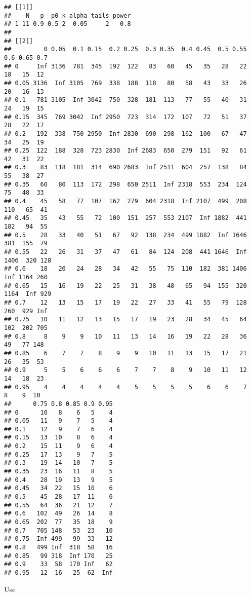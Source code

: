 \documentclass[
]{article}
\begin{document}
\begin{verbatim}
## [[1]]
##    N   p  p0 k alpha tails power
## 1 11 0.9 0.5 2  0.05     2   0.8
## 
## [[2]]
##         0 0.05  0.1 0.15  0.2 0.25  0.3 0.35  0.4 0.45  0.5 0.55  0.6 0.65 0.7
## 0     Inf 3136  781  345  192  122   83   60   45   35   28   22   18   15  12
## 0.05 3136  Inf 3105  769  338  188  118   80   58   43   33   26   20   16  13
## 0.1   781 3105  Inf 3042  750  328  181  113   77   55   40   31   24   19  15
## 0.15  345  769 3042  Inf 2950  723  314  172  107   72   51   37   28   22  17
## 0.2   192  338  750 2950  Inf 2830  690  298  162  100   67   47   34   25  19
## 0.25  122  188  328  723 2830  Inf 2683  650  279  151   92   61   42   31  22
## 0.3    83  118  181  314  690 2683  Inf 2511  604  257  138   84   55   38  27
## 0.35   60   80  113  172  298  650 2511  Inf 2318  553  234  124   75   48  33
## 0.4    45   58   77  107  162  279  604 2318  Inf 2107  499  208  110   65  41
## 0.45   35   43   55   72  100  151  257  553 2107  Inf 1882  441  182   94  55
## 0.5    28   33   40   51   67   92  138  234  499 1882  Inf 1646  381  155  79
## 0.55   22   26   31   37   47   61   84  124  208  441 1646  Inf 1406  320 128
## 0.6    18   20   24   28   34   42   55   75  110  182  381 1406  Inf 1164 260
## 0.65   15   16   19   22   25   31   38   48   65   94  155  320 1164  Inf 929
## 0.7    12   13   15   17   19   22   27   33   41   55   79  128  260  929 Inf
## 0.75   10   11   12   13   15   17   19   23   28   34   45   64  102  202 705
## 0.8     8    9    9   10   11   13   14   16   19   22   28   36   49   77 148
## 0.85    6    7    7    8    9    9   10   11   13   15   17   21   26   35  53
## 0.9     5    5    6    6    6    7    7    8    9   10   11   12   14   18  23
## 0.95    4    4    4    4    4    5    5    5    5    6    6    7    8    9  10
##      0.75 0.8 0.85 0.9 0.95
## 0      10   8    6   5    4
## 0.05   11   9    7   5    4
## 0.1    12   9    7   6    4
## 0.15   13  10    8   6    4
## 0.2    15  11    9   6    4
## 0.25   17  13    9   7    5
## 0.3    19  14   10   7    5
## 0.35   23  16   11   8    5
## 0.4    28  19   13   9    5
## 0.45   34  22   15  10    6
## 0.5    45  28   17  11    6
## 0.55   64  36   21  12    7
## 0.6   102  49   26  14    8
## 0.65  202  77   35  18    9
## 0.7   705 148   53  23   10
## 0.75  Inf 499   99  33   12
## 0.8   499 Inf  318  58   16
## 0.85   99 318  Inf 170   25
## 0.9    33  58  170 Inf   62
## 0.95   12  16   25  62  Inf
\end{verbatim}

Use
\end{document}
